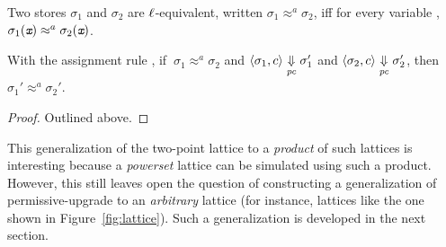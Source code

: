 \begin{mydef}
  Two stores $\sigma_1$ and $\sigma_2$ are $\ell$-equivalent,
  written $\sigma_1 \approx^a  \sigma_2$, iff for every variable \emph{},
  $\sigma_1(\emph{\texttt{x}}) \approx^a  \sigma_2(\emph{\texttt{x}})$.
\end{mydef}

\begin{myThm}
  With the assignment rule , if $~\sigma_1
  \approx^a \sigma_2$ and $\langle \sigma_1, c \rangle \underset{\mathit{pc}}{\Downarrow}
  \sigma_1' $ and $\langle \sigma_2, c \rangle \underset{\mathit{pc}}{\Downarrow} \sigma_2'
  $, then $\sigma_1' \approx^a \sigma_2'$.
\end{myThm}
\begin{proof} Outlined above.
\end{proof}


This generalization of the two-point lattice to a \emph{product}
of such lattices is interesting because a \emph{powerset} lattice
can be simulated using such a product. However, this still leaves open
the question of constructing a generalization of permissive-upgrade to
an \emph{arbitrary} lattice (for instance, lattices like the one shown
in Figure~\ref{fig:lattice}). Such a generalization is developed in
the next section.

